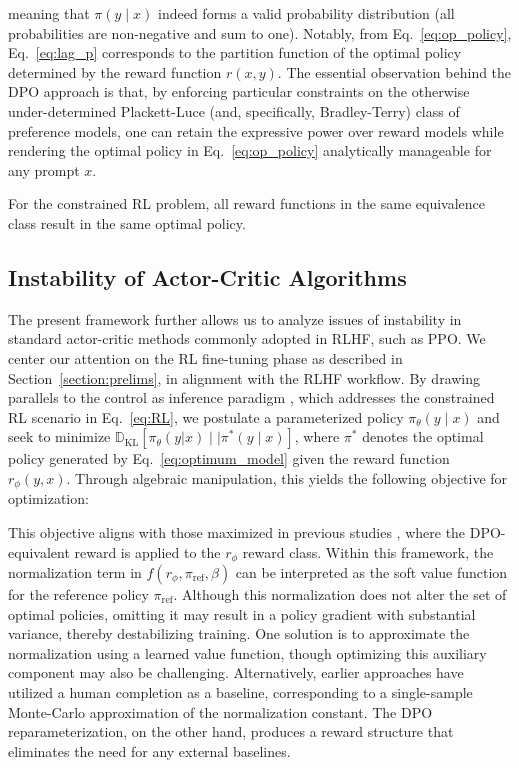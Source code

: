 meaning that $\pi(y\mid x)$ indeed forms a valid probability distribution (all probabilities are non-negative and sum to one). Notably, from Eq.~\ref{eq:op_policy}, Eq.~\ref{eq:lag_p} corresponds to the partition function of the optimal policy determined by the reward function $r(x, y)$. The essential observation behind the DPO approach is that, by enforcing particular constraints on the otherwise under-determined Plackett-Luce (and, specifically, Bradley-Terry) class of preference models, one can retain the expressive power over reward models while rendering the optimal policy in Eq.~\ref{eq:op_policy} analytically manageable for any prompt $x$.

\begin{lemma}\label{lemma:same_policy}
    For the constrained RL problem, all reward functions in the same equivalence class result in the same optimal policy.
\end{lemma}

\subsection{Instability of Actor-Critic Algorithms}
The present framework further allows us to analyze issues of instability in standard actor-critic methods commonly adopted in RLHF, such as PPO. We center our attention on the RL fine-tuning phase as described in Section~\ref{section:prelims}, in alignment with the RLHF workflow. By drawing parallels to the control as inference paradigm \cite{levine2018reinforcement}, which addresses the constrained RL scenario in Eq.~\ref{eq:RL}, we postulate a parameterized policy $\pi_{\theta}(y\mid x)$ and seek to minimize $\mathbb{D}_{\text{KL}}[\pi_{\theta}(y|x) \mid \mid \pi^*(y\mid x)]$, where $\pi^*$ denotes the optimal policy generated by Eq.~\ref{eq:optimum_model} given the reward function $r_{\phi}(y, x)$. Through algebraic manipulation, this yields the following objective for optimization:

This objective aligns with those maximized in previous studies 
\citep{ziegler2020finetuning, stiennon2022learning, bai2022training, ouyang2022training}, where the DPO-equivalent reward is applied to the $r_{\phi}$ reward class. Within this framework, the normalization term in $f(r_{\phi}, \pi_\text{ref}, \beta)$ can be interpreted as the soft value function for the reference policy $\pi_\text{ref}$. Although this normalization does not alter the set of optimal policies, omitting it may result in a policy gradient with substantial variance, thereby destabilizing training. One solution is to approximate the normalization using a learned value function, though optimizing this auxiliary component may also be challenging. Alternatively, earlier approaches have utilized a human completion as a baseline, corresponding to a single-sample Monte-Carlo approximation of the normalization constant. The DPO reparameterization, on the other hand, produces a reward structure that eliminates the need for any external baselines.

